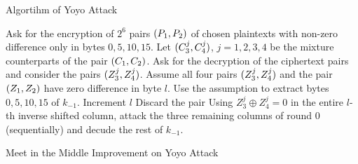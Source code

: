 \documentclass[notheorems]{beamer}
\theoremstyle{definition}
\theoremstyle{example}
\begin{document}
    \begin{frame}{Algortihm of Yoyo Attack}
        \begin{algorithm}[H]
            \caption{Yoyo Attack on Five Round AES}
            \label{alg:yoyo-aes}
            \algrenewcommand{}
            \scriptsize
            \begin{algorithmic}[1]
                \State Ask for the encryption of \(2^6\) pairs \((P_1,
                P_2)\) of chosen plaintexts with non-zero difference only in 
                bytes \(0, 5, 10, 15\).
                    \State Let \((C_3^j, C_4^j)\), \(j = 1, 2, 3, 4\) be
                    the mixture counterparts of the pair \((C_1, C_2)\).
                    \State Ask for the decryption of the ciphertext pairs and
                    consider the pairs \((Z_3^j, Z_4^j)\).
                        \State Assume all four pairs \((Z_3^j, Z_4^j)\) and
                        the pair \((Z_1, Z_2)\) have zero difference in 
                        byte \(l\).
                        \State Use the assumption to extract bytes \(0, 5, 10,
                        15\) of \(k_{-1}\).
                            \State Increment \(l\)
                                Discard the pair
                            \EndIf
                        \Else
                            \State Using \(Z_3^j \oplus Z_4^j = 0\) in the
                            entire \(l\)-th inverse shifted column, attack the
                            three remaining columns of round 0 (sequentially)
                            and decude the rest of \(k_{-1}\).
                        \EndIf
                    \EndFor
                \EndFor
            \end{algorithmic}
        \end{algorithm}
    \end{frame}

    \begin{frame}{Meet in the Middle Improvement on Yoyo Attack}
        
    \end{frame}
\end{document}

